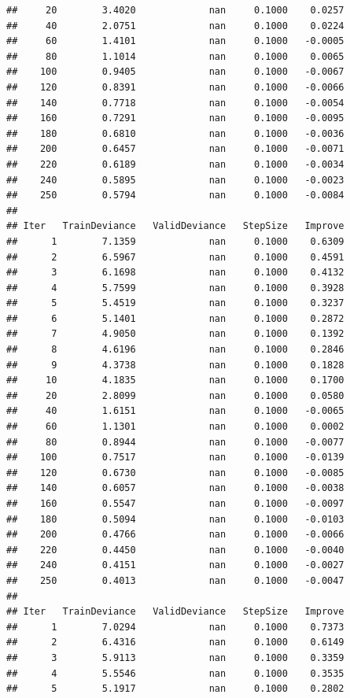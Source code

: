 \documentclass[
]{book}
\begin{document}
\begin{verbatim}
##     20        3.4020             nan     0.1000    0.0257
##     40        2.0751             nan     0.1000    0.0224
##     60        1.4101             nan     0.1000   -0.0005
##     80        1.1014             nan     0.1000    0.0065
##    100        0.9405             nan     0.1000   -0.0067
##    120        0.8391             nan     0.1000   -0.0066
##    140        0.7718             nan     0.1000   -0.0054
##    160        0.7291             nan     0.1000   -0.0095
##    180        0.6810             nan     0.1000   -0.0036
##    200        0.6457             nan     0.1000   -0.0071
##    220        0.6189             nan     0.1000   -0.0034
##    240        0.5895             nan     0.1000   -0.0023
##    250        0.5794             nan     0.1000   -0.0084
## 
## Iter   TrainDeviance   ValidDeviance   StepSize   Improve
##      1        7.1359             nan     0.1000    0.6309
##      2        6.5967             nan     0.1000    0.4591
##      3        6.1698             nan     0.1000    0.4132
##      4        5.7599             nan     0.1000    0.3928
##      5        5.4519             nan     0.1000    0.3237
##      6        5.1401             nan     0.1000    0.2872
##      7        4.9050             nan     0.1000    0.1392
##      8        4.6196             nan     0.1000    0.2846
##      9        4.3738             nan     0.1000    0.1828
##     10        4.1835             nan     0.1000    0.1700
##     20        2.8099             nan     0.1000    0.0580
##     40        1.6151             nan     0.1000   -0.0065
##     60        1.1301             nan     0.1000    0.0002
##     80        0.8944             nan     0.1000   -0.0077
##    100        0.7517             nan     0.1000   -0.0139
##    120        0.6730             nan     0.1000   -0.0085
##    140        0.6057             nan     0.1000   -0.0038
##    160        0.5547             nan     0.1000   -0.0097
##    180        0.5094             nan     0.1000   -0.0103
##    200        0.4766             nan     0.1000   -0.0066
##    220        0.4450             nan     0.1000   -0.0040
##    240        0.4151             nan     0.1000   -0.0027
##    250        0.4013             nan     0.1000   -0.0047
## 
## Iter   TrainDeviance   ValidDeviance   StepSize   Improve
##      1        7.0294             nan     0.1000    0.7373
##      2        6.4316             nan     0.1000    0.6149
##      3        5.9113             nan     0.1000    0.3359
##      4        5.5546             nan     0.1000    0.3535
##      5        5.1917             nan     0.1000    0.2802

\end{verbatim}
\end{document}
